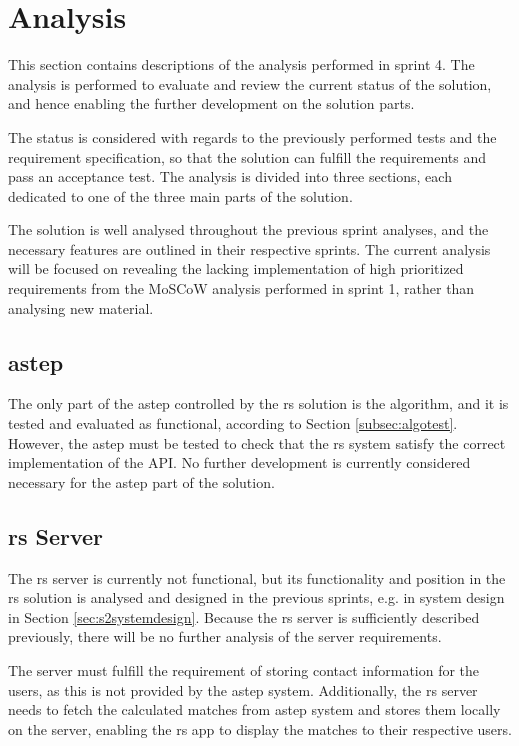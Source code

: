 \section{Analysis}
This section contains descriptions of the analysis performed in sprint 4.
The analysis is performed to evaluate and review the current status of the solution, and hence enabling the further development on the solution parts.

The status is considered with regards to the previously performed tests and the requirement specification, so that the solution can fulfill the requirements and pass an acceptance test.
The analysis is divided into three sections, each dedicated to one of the three main parts of the solution.

The solution is well analysed throughout the previous sprint analyses, and the necessary features are outlined in their respective sprints.
The current analysis will be focused on revealing the lacking implementation of high prioritized requirements from the MoSCoW analysis performed in sprint 1, rather than analysing new material.


\subsection{\gls{astep}}
The only part of the \gls{astep} controlled by the \gls{rs} solution is the algorithm, and it is tested and evaluated as functional, according to Section \ref{subsec:algotest}. 
However, the \gls{astep} must be tested to check that the \gls{rs} system satisfy the correct implementation of the API.
No further development is currently considered necessary for the \gls{astep} part of the solution.


\subsection{\gls{rs} Server}
The \gls{rs} server is currently not functional, but its functionality and position in the \gls{rs} solution is analysed and designed in the previous sprints, e.g. in system design in Section \ref{sec:s2systemdesign}. Because the \gls{rs} server is sufficiently described previously, there will be no further analysis of the server requirements.

The server must fulfill the requirement of storing contact information for the users, as this is not provided by the \gls{astep} system.
Additionally, the \gls{rs} server needs to fetch the calculated matches from \gls{astep} system and stores them locally on the server, enabling the \gls{rs} app to display the matches to their respective users.


